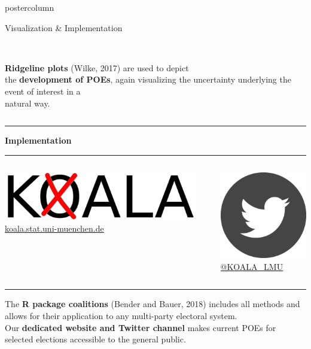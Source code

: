 \documentclass[final,hyperref={pdfpagelabels=false}]{beamer}
\newcommand{\bfBlue}[1]{\textcolor{koaladarkestblue}{\textbf{#1}}}
\newcommand{\blue}[1]{\textcolor{koaladarkestblue}{#1}}
\newcommand{\darkgray}[1]{\textcolor{koaladarkgray}{#1}}
\begin{document}
\begin{frame}
\begin{columns}
\begin{column}{1\textwidth}
\begin{columns}[T]
\begin{column}{.484\textwidth}
\begin{beamercolorbox}[center,wd=\textwidth]{postercolumn}
\begin{minipage}[T]{.95\textwidth}
\begin{block}{\footnotesize Visualization \& Implementation}
\begin{columns}[t]
  \begin{column}{.6\textwidth}
  \ \\[70px]
  \darkgray{\textbf{Ridgeline plots}} {\footnotesize (Wilke, 2017)} are used to depict \\
  the \darkgray{\textbf{development of POEs}}, again visualizing the uncertainty 
  underlying the event of interest in a \\ natural way.
  \end{column}
\end{columns}
\vspace{1ex}
\textcolor{LMUlightgray}{\hrule{}}
\vspace{48px}
\bfBlue{Implementation}
\\[0.05cm]
\textcolor{LMUlightgray}{\hrule{}}
\vspace{1ex}
\begin{columns}[t]
  \begin{column}{.45\textwidth}
  \begin{center}\centering
  \includegraphics[height=3.5ex]{figures/Koala_Logo_ohneSchrift} \\
  \blue{\footnotesize \href{http://koala.stat.uni-muenchen.de}{koala.stat.uni-muenchen.de}}
  \end{center}
  \end{column}

  \hspace{-1.5ex}
  \textcolor{LMUlightgray}{\vrule{}}
  \hspace{1.5ex}

  \begin{column}{.45\textwidth}
  \begin{center}\centering
  \includegraphics[height=3.5ex]{figures/implementation_twitter} \\
  \blue{\footnotesize \href{https://twitter.com/KOALA_LMU}{@KOALA\_LMU}}
  \end{center}
  \end{column}
\end{columns}
\vspace{1ex}
\textcolor{LMUlightgray}{\hrule{}}
\vspace{3ex}

The \darkgray{\textbf{R package coalitions}} {\footnotesize (Bender and Bauer, 2018)}
includes all methods and allows for their application to any multi-party electoral system.
\\[0.75cm]
Our \darkgray{\textbf{dedicated website and Twitter channel}} makes current POEs
for selected elections accessible to the general public.


\end{block}
\end{minipage}
\end{beamercolorbox}
\end{column}
\end{columns}
\end{column}
\end{columns}
\end{frame}
\end{document}
